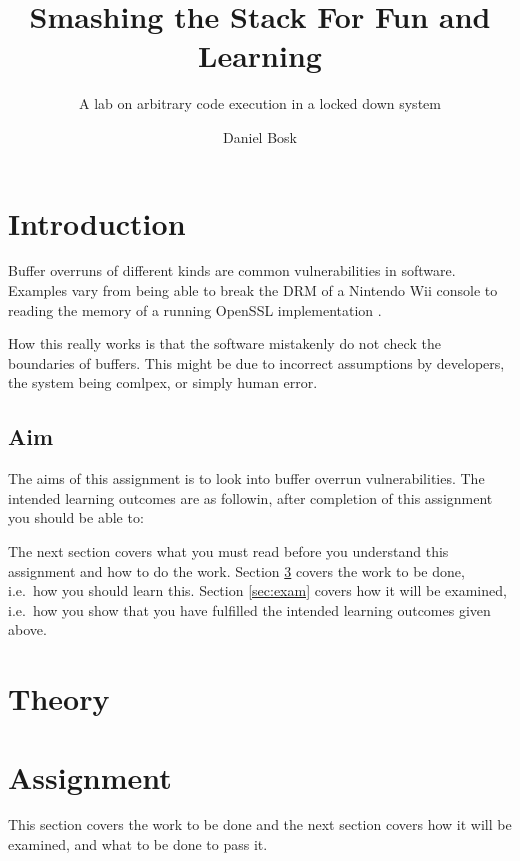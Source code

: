 \title{Smashing the Stack For Fun and Learning}
\subtitle{A lab on arbitrary code execution in a locked down system}

\author{%
  Daniel Bosk
}

\maketitle


\section{Introduction}
\label{sec:intro}
Buffer overruns of different kinds are common vulnerabilities in software.
Examples vary from being able to break the DRM of a Nintendo Wii console 
\cite{twilighthack} to reading the memory of a running OpenSSL implementation 
\cite{heartbleed}.

How this really works is that the software mistakenly do not check the 
boundaries of buffers.
This might be due to incorrect assumptions by developers, the system being 
comlpex, or simply human error.

\subsection{Aim}
\label{sec:aim}
The aims of this assignment is to look into buffer overrun vulnerabilities.
The intended learning outcomes are as followin, after completion of this 
assignment you should be able to:
\begin{itemize}
  
\end{itemize}

The next section covers what you must read before you understand this 
assignment and how to do the work.
Section \ref{sec:tasks} covers the work to be done, i.e.~how you should learn 
this.
Section \ref{sec:exam} covers how it will be examined, i.e.~how you show that 
you have fulfilled the intended learning outcomes given above.


\section{Theory}
\label{sec:reading}



\section{Assignment}
\label{sec:tasks}
This section covers the work to be done and the next section covers how it will 
be examined, and what to be done to pass it.

